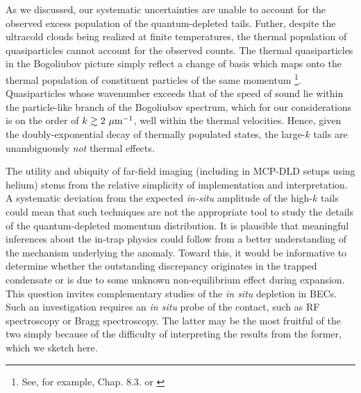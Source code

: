 	As we discussed, our systematic uncertainties are unable to account for the observed excess population of the quantum-depleted tails.
	Futher, despite the ultracold clouds being realized at finite temperatures, the thermal population of quasiparticles cannot account for the observed counts. 
	The thermal quasiparticles in the Bogoliubov picture simply reflect a change of basis which maps onto the thermal population of constituent particles of the same momentum \footnote{See, for example, \cite{PethickSmith} Chap. 8.3. or \cite{Vogels02}}. 
	Quasiparticles whose wavenumber exceeds that of the speed of sound lie within the particle-like branch of the Bogoliubov spectrum, which for our considerations is on the order of $k\gtrsim2~\mu\textrm{m}^{-1}$, well within the thermal velocities.  
	Hence, given the doubly-exponential decay of thermally populated states, the large-$k$ tails are unambiguously \emph{not} thermal effects. 

	The utility and ubiquity of far-field imaging (including in MCP-DLD setups using helium) stems from the relative simplicity of implementation and interpretation.
	A systematic deviation from the expected \emph{in-situ} amplitude of the high-$k$ tails could mean that such techniques are not the appropriate tool to study the details of the quantum-depleted momentum distribution.
	It is plausible that meaningful inferences about the in-trap physics could follow from  a better understanding of the mechanism underlying the anomaly.
	Toward this, it would be informative to determine whether the outstanding discrepancy originates in the trapped condensate or is due to some unknown non-equilibrium effect during expansion.
	This question invites complementary studies of the \emph{in situ} depletion in \mhe BECs. 
	Such an investigation requires an \emph{in situ} probe of the contact, such as RF spectroscopy or Bragg spectroscopy.
	The latter may be the most fruitful of the two simply because of the difficulty of interpreting the results from the former, which we sketch here. 
	
